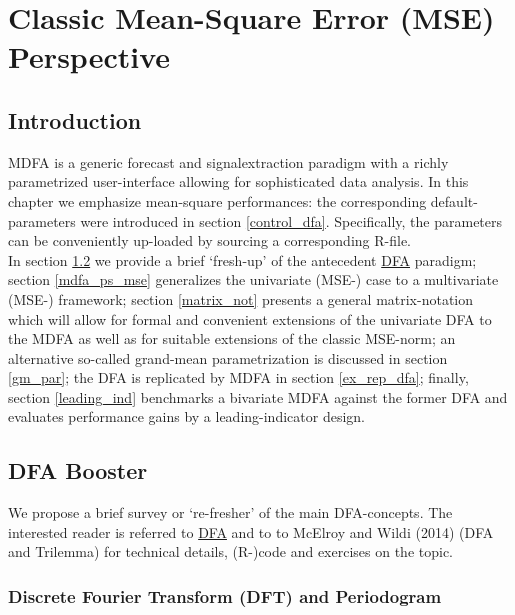 \documentclass[a4paper]{book}
\begin{document}
\chapter{Classic Mean-Square Error (MSE) Perspective}\label{mse_sec}

\section{Introduction}

MDFA is a generic forecast and signalextraction paradigm with a richly parametrized user-interface allowing for sophisticated data analysis. In this chapter we emphasize mean-square performances: the corresponding default-parameters were introduced in section \ref{control_dfa}. Specifically, the parameters can be conveniently up-loaded by sourcing a corresponding R-file. \\

In section \ref{fresh_up} we provide a brief `fresh-up' of the antecedent \href{http://blog.zhaw.ch/sef/files/2014/10/DFA.pdf}{DFA} paradigm; section \ref{mdfa_ps_mse} generalizes the univariate (MSE-) case to a multivariate (MSE-) framework; section \ref{matrix_not} presents a general matrix-notation which will allow for formal and convenient extensions of the univariate DFA to the MDFA as well as for suitable extensions of the classic MSE-norm; an alternative so-called grand-mean parametrization is discussed in section \ref{gm_par}; the DFA is replicated by MDFA in section \ref{ex_rep_dfa}; finally, section \ref{leading_ind} benchmarks a bivariate MDFA against the former DFA and evaluates performance gains by a leading-indicator design.

\section{DFA Booster}\label{fresh_up}

We propose a brief survey or `re-fresher' of the main DFA-concepts. The interested reader is referred  to \href{http://blog.zhaw.ch/sef/files/2014/10/DFA.pdf}{DFA} and to to McElroy and Wildi (2014) (DFA and Trilemma) for technical details, (R-)code and exercises on the topic.



\subsection{Discrete Fourier Transform (DFT) and Periodogram}\label{dft_and_per}
\end{document}
